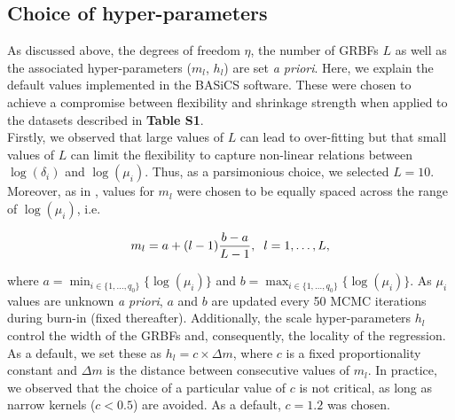\newpage

\subsection{Choice of hyper-parameters} \label{sec2:hyper-parameters}

As discussed above, the degrees of freedom $\eta$, the number of GRBFs  $L$ as well as the associated hyper-parameters ($m_l$, $h_l$) are set \emph{a priori}. Here, we explain the default values implemented in the BASiCS software. These were chosen to achieve a compromise between flexibility and shrinkage strength when applied to the datasets described in \textbf{Table S1}. \\ 

Firstly, we observed that large values of $L$ can lead to over-fitting but that small values of $L$ can limit the flexibility to capture non-linear relations between $\log(\delta_i)$ and $\log(\mu_i)$. Thus, as a parsimonious choice, we selected $L = 10$. Moreover, as in \cite{Kapourani2016}, values for $m_l$ were chosen to be equally spaced across the range of $\log(\mu_i)$, i.e. 

\begin{equation} m_l = a + (l-1)\frac{b - a }{L-1}, \hspace{0.2cm}  l=1,\ldots, L, \end{equation} 

where $a=\min_{i\in\{1,\ldots,q_0\}}\{\log(\mu_i)\}$ and $b=\max_{i\in\{1,\ldots,q_0\}}\{\log(\mu_i)\}$. As $\mu_i$ values are unknown \emph{a priori}, $a$ and $b$ are updated every 50 MCMC iterations during burn-in (fixed thereafter). Additionally, the scale hyper-parameters $h_l$ control the width of the GRBFs and, consequently, the locality of the regression. As a default, we set these as $h_l = c \times \Delta m$, where $c$ is a fixed proportionality constant and $\Delta m$ is the distance between consecutive values of $m_l$. In practice, we observed that the choice of a particular value of $c$ is not critical, as long as narrow kernels ($c<0.5$) are avoided. As a default, $c = 1.2$ was chosen. \\

